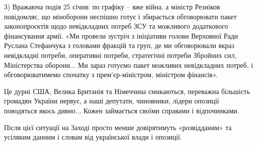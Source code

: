 3) Вражаюча подія 25 січня: по графіку – вже війна, а міністр Резніков
повідомляє, що міноборони неспішно готує і збирається обговорювати пакет
законопроєктів щодо невідкладних потреб ЗСУ та можливого додаткового
фінансування армії.  «Ми провели зустріч з ініціативи голови Верховної Ради
Руслана Стефанчука з головами фракцій та груп, де ми обговорювали якраз
невідкладні потреби, оперативні потреби, стратегічні потреби Збройних сил,
Міністерства оборони... Ми зараз готуємо пакет можливих невідкладних потреб, і
обговорюватимемо спочатку з прем'єр-міністром, міністром фінансів».

Це дурні США, Велика Британія та Німеччина смикаються, переважна більшість
громадян України нервує, а наші депутати, чиновники, лідери опозиції поводяться
якось дивно... Кожен займається своїми справами і відпочинками.   

Після цієї ситуації на Заході просто менше довірятимуть «розвідданим» та
усіляким данним і словам від української влади і опозиції.
